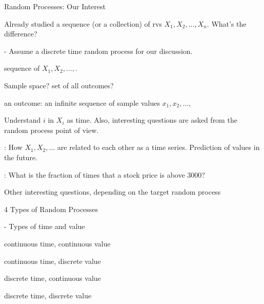 \begin{frame}{Random Processes: Our Interest}
  
\plitemsep 0.07in
\bci
  
 \item<2->  Already studied a sequence (or a
   collection) of rvs $X_1, X_2, \ldots, X_n.$ What's the difference?

-  Assume a discrete time random process for our discussion.
  
\item<3->   sequence of $X_1, X_2, \ldots, .$
  \bci
\item<4-> Sample space? set of all outcomes?
\item<5-> an outcome: an infinite sequence of sample values $x_1, x_2, \ldots,$ 
\eci

\item<6->  Understand $i$ in $X_i$ as
  time. Also, interesting questions are asked from the random process point of view.

  \bci
\item<7-> : How $X_1, X_2, \ldots$ are related to each other
  as a time series. Prediction of values in the future.
\item<8-> : What is the fraction of times that a
  stock price is above 3000?
\item<9-> Other interesting questions, depending on the target random process
  \eci
  
\eci

\end{frame}



\begin{frame}{4 Types of Random Processes}

- Types of time and value

\bigskip
{}
{
\bigskip
\small
\plitemsep 0.1in
\bce[(a)]
\item continuous time, continuous value
\item continuous time, discrete value
\item discrete time, continuous value
\item discrete time, discrete value
\ece

}
{
\centering
{}

}

\end{frame}



